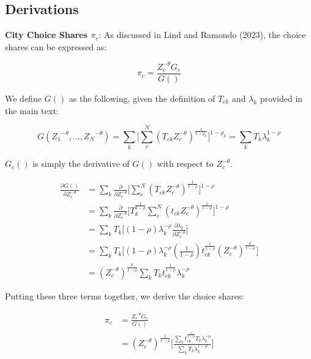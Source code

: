 \documentclass[10pt]{article}
\begin{document}
\subsection{Derivations}

\noindent\textbf{City Choice Shares $\pi_{c}$}: As discussed in Lind and Ramondo (2023), the choice shares can be expressed as:

\begin{equation*}
    \pi_{c}=\frac{Z_{c}^{-\theta}{G_{c}}}{G()}
\end{equation*}

We define $G()$ as the following, given the definition of $T_{ck}$ and $\lambda_{k}$ provided in the main text:

\begin{equation*}
    G({Z_{1}}^{-\theta},...,{Z_{N}}^{-\theta})=\sum\limits_{k}\Big[\sum\limits_{c}^{N}({T_{ck}}{Z_{c}^{-\theta}})^{\frac{1}{1-\rho_{k}}}\Big]^{1-\rho_{k}} = \sum\limits_{k}{T_{k}}\lambda^{1-\rho}_{k}
\end{equation*}

$G_{c}()$ is simply the derivative of $G()$ with respect to $Z_{c}^{-\theta}$.

\begin{align*}
    \frac{\partial{G()}}{\partial{Z_{c}^{-\theta}}} & = \sum\limits_{k}\frac{\partial}{\partial{Z_{c}^{-\theta}}}\Big[\sum\limits_{c}^{N}({T_{ck}}{Z_{c}^{-\theta}})^{\frac{1}{1-\rho}}\Big]^{1-\rho} \\ &= \sum\limits_{k}\frac{\partial}{\partial{Z_{c}^{-\theta}}}\Big[{T^{\frac{1}{1-\rho}}_{k}}\sum\limits_{c}^{N}({t_{ck}}{Z_{c}^{-\theta}})^{\frac{1}{1-\rho}}\Big]^{1-\rho} \\ &= \sum\limits_{k}{T_{k}}\Big[(1-\rho)\lambda^{-\rho}_{k}\frac{\partial{\lambda_{k}}}{\partial{Z_{c}^{-\theta}}}\Big] \\ &= \sum\limits_{k}{T_{k}}\Big[(1-\rho)\lambda^{-\rho}_{k}(\frac{1}{1-\rho}){t^{\frac{1}{1-\rho}}_{ck}}(Z_{c}^{-\theta})^{\frac{\rho}{1-\rho}}\Big]\\ &= (Z_{c}^{-\theta})^{\frac{\rho}{1-\rho}}\sum\limits_{k}{T_{k}}{t^{\frac{1}{1-\rho}}_{ck}}\lambda_{k}^{-\rho}
\end{align*}

Putting these three terms together, we derive the choice shares:

\begin{align*}
    \pi_{c} & = \frac{Z_{c}^{-\theta}{G_{c}}}{G()} \\ &= (Z_{c}^{-\theta})^{\frac{1}{1-\rho}}\Bigg[\frac{\sum\limits_{k}{t^{\frac{1}{1-\rho}}_{ck}}{T_{k}}\lambda_{k}^{-\rho}}{\sum\limits_{k}{T_{k}}\lambda_{k}^{1-\rho}}\Bigg]
\end{align*}
\end{document}

